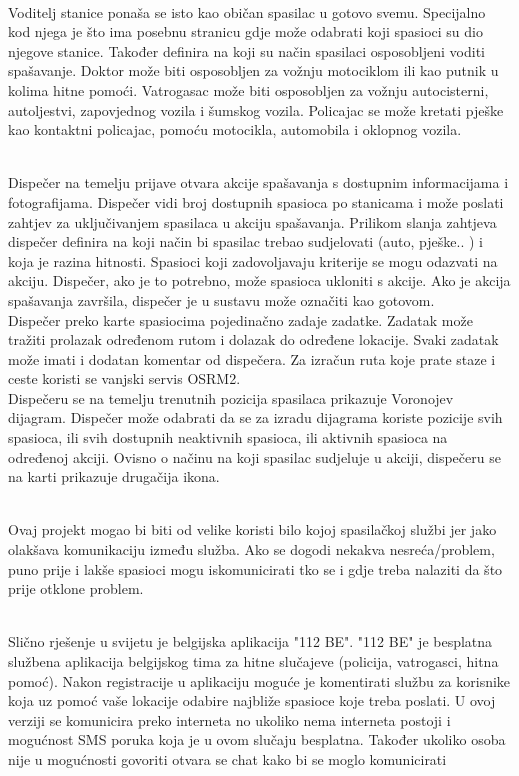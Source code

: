 	
		\textbf{}\\
		\text Voditelj stanice ponaša se isto kao običan spasilac u gotovo svemu. Specijalno kod njega je što ima posebnu stranicu gdje može odabrati koji spasioci su dio njegove stanice. Također definira na koji su način spasilaci osposobljeni voditi spašavanje. Doktor može biti osposobljen za vožnju motociklom ili kao putnik u kolima hitne pomoći. Vatrogasac može biti osposobljen za vožnju autocisterni, autoljestvi, zapovjednog vozila i šumskog vozila. Policajac se može kretati pješke kao kontaktni policajac, pomoću motocikla, automobila i oklopnog vozila.
		
		\textbf{}\\
		\text Dispečer na temelju prijave otvara akcije spašavanja s dostupnim informacijama i fotografijama. Dispečer vidi broj dostupnih spasioca po stanicama i može poslati zahtjev za uključivanjem spasilaca u akciju spašavanja. Prilikom slanja zahtjeva dispečer definira na koji način bi spasilac trebao sudjelovati (auto, pješke.. ) i koja je razina hitnosti. Spasioci koji zadovoljavaju kriterije se mogu odazvati na akciju. Dispečer, ako je to potrebno, može spasioca ukloniti s akcije. Ako je akcija spašavanja završila, dispečer je u sustavu može označiti kao gotovom.\\
		Dispečer preko karte spasiocima pojedinačno zadaje zadatke. Zadatak može tražiti prolazak određenom rutom i dolazak do određene lokacije. Svaki zadatak može imati i dodatan komentar od dispečera. Za izračun ruta koje prate staze i ceste koristi se vanjski servis OSRM2. \\
		Dispečeru se na temelju trenutnih pozicija spasilaca prikazuje Voronojev dijagram. Dispečer može odabrati da se za izradu dijagrama koriste pozicije svih spasioca, ili svih dostupnih neaktivnih spasioca, ili aktivnih spasioca na određenoj akciji. Ovisno o načinu na koji spasilac sudjeluje u akciji, dispečeru se na karti prikazuje drugačija ikona.
		
	
		\textbf{}\\
		\text Ovaj projekt mogao bi biti od velike koristi bilo kojoj spasilačkoj službi jer jako olakšava komunikaciju između služba. Ako se dogodi nekakva nesreća/problem, puno prije i lakše spasioci mogu iskomunicirati tko se i gdje treba nalaziti da što prije otklone problem.
		
		\textbf{}\\
		\text Slično rješenje u svijetu je belgijska aplikacija "112 BE". "112 BE" je besplatna službena aplikacija belgijskog tima za hitne slučajeve (policija, vatrogasci, hitna pomoć). Nakon registracije u aplikaciju moguće je komentirati službu za korisnike koja uz pomoć vaše lokacije odabire najbliže spasioce koje treba poslati. U ovoj verziji se komunicira preko  interneta no ukoliko nema interneta postoji i mogućnost SMS poruka koja je u ovom slučaju besplatna. Također ukoliko osoba nije u mogućnosti govoriti otvara se chat kako bi se moglo komunicirati  


